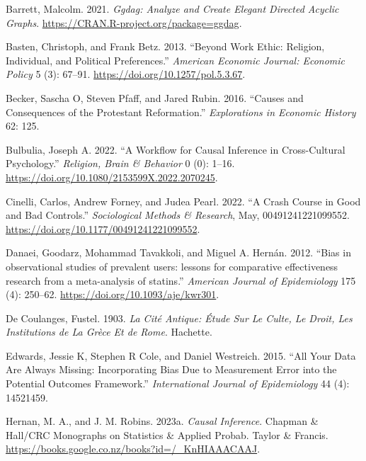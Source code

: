 \documentclass[
  singlecolumn]{report}
\newlength{\cslhangindent}
\newlength{\cslentryspacingunit} %
\newenvironment{CSLReferences}[2] %
 {%
  \setlength{\parindent}{0pt}
  \ifodd #1
  \let\oldpar\par
  \def\par{\hangindent=\cslhangindent\oldpar}
  \fi
  \setlength{\parskip}{#2\cslentryspacingunit}
 }%
 {}
\begin{document}
\hypertarget{refs}{}
\begin{CSLReferences}{1}{0}
\leavevmode{}%
Barrett, Malcolm. 2021. \emph{Ggdag: Analyze and Create Elegant Directed
Acyclic Graphs}. \url{https://CRAN.R-project.org/package=ggdag}.

\leavevmode{}%
Basten, Christoph, and Frank Betz. 2013. {``Beyond Work Ethic: Religion,
Individual, and Political Preferences.''} \emph{American Economic
Journal: Economic Policy} 5 (3): 67--91.
\url{https://doi.org/10.1257/pol.5.3.67}.

\leavevmode{}%
Becker, Sascha O, Steven Pfaff, and Jared Rubin. 2016. {``Causes and
Consequences of the Protestant Reformation.''} \emph{Explorations in
Economic History} 62: 125.

\leavevmode{}%
Bulbulia, Joseph A. 2022. {``A Workflow for Causal Inference in
Cross-Cultural Psychology.''} \emph{Religion, Brain \& Behavior} 0 (0):
1--16. \url{https://doi.org/10.1080/2153599X.2022.2070245}.

\leavevmode{}%
Cinelli, Carlos, Andrew Forney, and Judea Pearl. 2022. {``A Crash Course
in Good and Bad Controls.''} \emph{Sociological Methods \& Research},
May, 00491241221099552. \url{https://doi.org/10.1177/00491241221099552}.

\leavevmode{}%
Danaei, Goodarz, Mohammad Tavakkoli, and Miguel A. Hernán. 2012. {``Bias
in observational studies of prevalent users: lessons for comparative
effectiveness research from a meta-analysis of statins.''}
\emph{American Journal of Epidemiology} 175 (4): 250--62.
\url{https://doi.org/10.1093/aje/kwr301}.

\leavevmode{}%
De Coulanges, Fustel. 1903. \emph{La Cité Antique: Étude Sur Le Culte,
Le Droit, Les Institutions de La Grèce Et de Rome}. Hachette.

\leavevmode{}%
Edwards, Jessie K, Stephen R Cole, and Daniel Westreich. 2015. {``All
Your Data Are Always Missing: Incorporating Bias Due to Measurement
Error into the Potential Outcomes Framework.''} \emph{International
Journal of Epidemiology} 44 (4): 14521459.

\leavevmode{}%
Hernan, M. A., and J. M. Robins. 2023a. \emph{Causal Inference}. Chapman
\& Hall/CRC Monographs on Statistics \& Applied Probab. Taylor \&
Francis. \url{https://books.google.co.nz/books?id=/_KnHIAAACAAJ}.


\end{CSLReferences}
\end{document}
